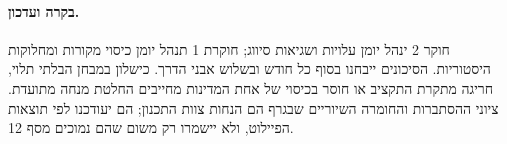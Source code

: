 \paragraph{בקרה ועדכון.} חוקר 2 ינהל יומן עלויות ושגיאות סיווג; חוקרת 1 תנהל יומן כיסוי מקורות ומחלוקות היסטוריות. הסיכונים ייבחנו בסוף כל חודש ובשלוש אבני הדרך. כישלון במבחן הבלתי תלוי, חריגה מתקרת התקציב או חוסר בכיסוי של אחת המדינות מחייבים החלטת מנחה מתועדת. ציוני ההסתברות והחומרה השיוריים שבגרף הם הנחות צוות התכנון; הם יעודכנו לפי תוצאות הפיילוט, ולא יישמרו רק משום שהם נמוכים מסף 12.
